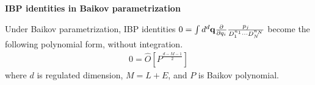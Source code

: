 \documentclass[10pt]{article}
\begin{document}
\textbf{IBP identities in Baikov parametrization}

Under Baikov parametrization, IBP identities $0 = \int d^d \bold{q} \frac{\partial }{\partial q_i} \frac{p_j}{D_1^{n_1} \cdots D_N^{n_N}}$ become the following polynomial form, without integration.
\begin{eqnarray}
\nonumber
0= \hat{O} \left[ P ^{\frac{d-M-1}{2}} \right]
\end{eqnarray}
where $d$ is regulated dimension, $M=L+E$, and $P$ is Baikov polynomial.
\end{document}
